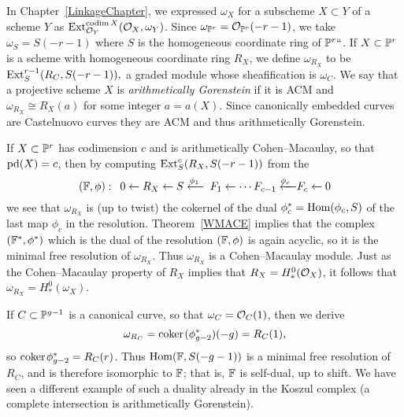 In Chapter~\ref{LinkageChapter},  we expressed $\omega_X$
for a subscheme $X\subset Y$ of a scheme $Y$ as
${\rm{Ext}}^{\operatorname{codim} X}_{{\mathcal O}_Y}({\mathcal O}_X, \omega_Y)$. 
Since $\omega_{{\mathbb P}^{r}} = {\mathcal O}_{{\mathbb P}^{r}}(-r-1)$,
we take $\omega_{S} = S(-r-1)$
where $S$
is the homogeneous coordinate ring of ${\mathbb P}^r` `$.
If $X\subset {\mathbb P}^r$ is a scheme
with homogeneous coordinate ring $R_{X}$,
we define $\omega_{R_X}$ to be 
$
{\rm{Ext}}^{r-1}_S(R_C, S(-r-1)),
$
 a graded module whose sheafification 
 is  $\omega_C$.
We say that a projective scheme $X$ is
\emph{arithmetically Gorenstein}
%
if it is ACM and 
$\omega_{R_{X}} \cong R_{X}(a)$ for some integer $a = a(X)$. Since
canonically embedded curves are Castelnuovo curves they are ACM
and thus arithmetically Gorenstein.

If $X\subset {\mathbb P}^{r}$ has codimension $c$ and is arithmetically Cohen--Macaulay, so that
$\operatorname{pd} (X) = c$,  then by
computing ${\rm{Ext}}^{c}_S(R_X, S(-r-1))$ from the 
%
$$
(\FF, \phi):\quad 
0\leftarrow R_X \leftarrow S\luto{\phi_1} F_1 \leftarrow \cdots  
F_{c -1} \luto{\!\phi_{c}}\hskip-15pt-\ F_{c}\leftarrow 0
$$
we see that $\omega_{R_X}$ is (up to twist)
 the cokernel of the dual $\phi_{c}^{*} = \operatorname{Hom}(\phi_{c}, S)$
of the last map $\phi_{c}$ in the resolution. 
%
Theorem~\ref{WMACE}
implies that the complex $({\mathbb F}^*, \phi^*)$ which is the dual
of the  resolution $({\mathbb F}, \phi)$ is again acyclic, so it is the minimal
free resolution of $\omega_{R_X}$. Thus
$\omega_{R_X}$ is a Cohen--Macaulay module. Just as the Cohen--Macaulay
property of
$R_X$ implies that $R_X = H^0_*({\mathcal O}_X)$, it follows that $\omega_{R_X}
= H^0_*(\omega_X)$.

If $C\subset {\mathbb P}^{g-1}$ is a canonical curve, so that $\omega_C = {\mathcal O}_C(1)$,
then we derive
$$
\omega_{R_C} = {\rm{coker}\kern1pt}(\phi_{g-2}^*)(-g) = R_C(1)
,
$$
so ${\rm{coker}\kern1pt} \phi_{g-2}^* = R_C(r)$. Thus $\operatorname{Hom}({\mathbb F}, S(-g-1))$ is a
minimal free resolution of $R_C$, and is therefore isomorphic to
${\mathbb F}$; that is, ${\mathbb F}$ is self-dual, up to shift.
We have seen a different example of such a duality already
%
%
in the Koszul complex (a complete intersection is arithmetically Gorenstein).

